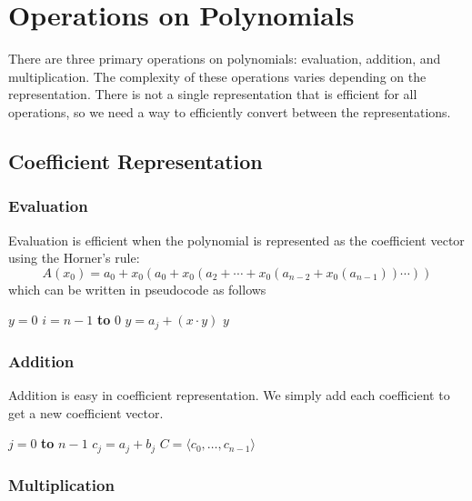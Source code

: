 \section{Operations on Polynomials}

There are three primary operations on polynomials: evaluation, addition, and multiplication. The complexity of these operations varies depending on the representation. There is not a single representation that is efficient for all operations, so we need a way to efficiently convert between the representations. 

\subsection{Coefficient Representation}

\subsubsection{Evaluation}

Evaluation is efficient when the polynomial is represented as the coefficient vector using the Horner's rule:
$$
A(x_0) = a_0 + x_0 (a_0 + x_0 (a_2 + \cdots + x_0 (a_{n-2} + x_0 (a_{n-1})) \cdots ))
$$
which can be written in pseudocode as follows
\begin{codebox}
    \li $y = 0$
    \li \For $i = n-1$ \textbf{to} 0 \Do
        \li $y = a_j + (x \cdot y)$
    \End
    \li \Return $y$ 
\end{codebox}

\subsubsection{Addition}

Addition is easy in coefficient representation. We simply add each coefficient to get a new coefficient vector.

\begin{codebox}
    \li \For $j = 0$ \textbf{to} $n-1$ \Do
        \li $c_j = a_j + b_j$
    \End
    \li \Return $C = \langle c_0,\ldots,c_{n-1} \rangle$
\end{codebox}

\subsubsection{Multiplication}

